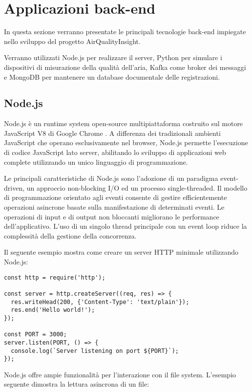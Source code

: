 \section{Applicazioni back-end}

In questa sezione verranno presentate le principali tecnologie back-end impiegate nello sviluppo del progetto AirQualityInsight.

Verranno utilizzati Node.js per realizzare il server, Python per simulare i dispositivi di misurazione della qualità dell'aria, Kafka come broker dei messaggi e MongoDB per mantenere un database documentale delle registrazioni.

\subsection{Node.js}

Node.js è un runtime system open-source multipiattaforma costruito sul motore JavaScript V8 di Google Chrome \citep{capan_2013_nodejs}. A differenza dei tradizionali ambienti JavaScript che operano esclusivamente nel browser, Node.js permette l'esecuzione di codice JavaScript lato server, abilitando lo sviluppo di applicazioni web complete utilizzando un unico linguaggio di programmazione.

Le principali caratteristiche di Node.js sono l'adozione di un paradigma event-driven, un approccio non-blocking I/O ed un processo single-threaded. Il modello di programmazione orientato agli eventi consente di gestire efficientemente operazioni asincrone basate sulla manifestazione di determinati eventi. Le operazioni di input e di output non bloccanti migliorano le performance dell'applicativo. L'uso di un singolo thread principale con un event loop riduce la complessità della gestione della concorrenza.

Il seguente esempio mostra come creare un server HTTP minimale utilizzando Node.js:

\begin{lstlisting}[caption={Server HTTP base in Node.js}]
const http = require('http');

const server = http.createServer((req, res) => {
  res.writeHead(200, {'Content-Type': 'text/plain'});
  res.end('Hello world!');
});

const PORT = 3000;
server.listen(PORT, () => {
  console.log(`Server listening on port ${PORT}`);
});
\end{lstlisting}

Node.js offre ampie funzionalità per l'interazione con il file system. L'esempio seguente dimostra la lettura asincrona di un file:

